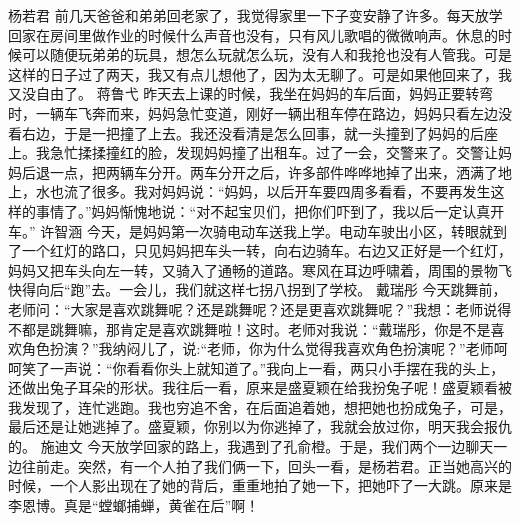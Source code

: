 {}\markdownRendererInterblockSeparator
{}杨若君\markdownRendererInterblockSeparator
{}前几天爸爸和弟弟回老家了，我觉得家里一下子变安静了许多。每天放学回家在房间里做作业的时候什么声音也没有，只有风儿歌唱的微微响声。休息的时候可以随便玩弟弟的玩具，想怎么玩就怎么玩，没有人和我抢也没有人管我。可是这样的日子过了两天，我又有点儿想他了，因为太无聊了。可是如果他回来了，我又没自由了。\markdownRendererInterblockSeparator
{}\markdownRendererInterblockSeparator
{}蒋鲁弋\markdownRendererInterblockSeparator
{}昨天去上课的时候，我坐在妈妈的车后面，妈妈正要转弯时，一辆车飞奔而来，妈妈急忙变道，刚好一辆出租车停在路边，妈妈只看左边没看右边，于是一把撞了上去。我还没看清是怎么回事，就一头撞到了妈妈的后座上。我急忙揉揉撞红的脸，发现妈妈撞了出租车。过了一会，交警来了。交警让妈妈后退一点，把两辆车分开。两车分开之后，许多部件哗哗地掉了出来，洒满了地上，水也流了很多。我对妈妈说：“妈妈，以后开车要四周多看看，不要再发生这样的事情了。”妈妈惭愧地说：“对不起宝贝们，把你们吓到了，我以后一定认真开车。”\markdownRendererInterblockSeparator
{}\markdownRendererInterblockSeparator
{}许智涵\markdownRendererInterblockSeparator
{}今天，是妈妈第一次骑电动车送我上学。电动车驶出小区，转眼就到了一个红灯的路口，只见妈妈把车头一转，向右边骑车。右边又正好是一个红灯，妈妈又把车头向左一转，又骑入了通畅的道路。寒风在耳边呼啸着，周围的景物飞快得向后“跑”去。一会儿，我们就这样七拐八拐到了学校。 \markdownRendererInterblockSeparator
{}\markdownRendererInterblockSeparator
{}戴瑞彤\markdownRendererInterblockSeparator
{}今天跳舞前，老师问：“大家是喜欢跳舞呢？还是跳舞呢？还是更喜欢跳舞呢？”我想：老师说得不都是跳舞嘛，那肯定是喜欢跳舞啦！这时。老师对我说：“戴瑞彤，你是不是喜欢角色扮演？”我纳闷儿了，说:“老师，你为什么觉得我喜欢角色扮演呢？”老师呵呵笑了一声说：“你看看你头上就知道了。”我向上一看，两只小手摆在我的头上，还做出兔子耳朵的形状。我往后一看，原来是盛夏颖在给我扮兔子呢！盛夏颖看被我发现了，连忙逃跑。我也穷追不舍，在后面追着她，想把她也扮成兔子，可是，最后还是让她逃掉了。盛夏颖，你别以为你逃掉了，我就会放过你，明天我会报仇的。\markdownRendererInterblockSeparator
{}\markdownRendererInterblockSeparator
{}施迪文\markdownRendererInterblockSeparator
{}今天放学回家的路上，我遇到了孔俞橙。于是，我们两个一边聊天一边往前走。突然，有一个人拍了我们俩一下，回头一看，是杨若君。正当她高兴的时候，一个人影出现在了她的背后，重重地拍了她一下，把她吓了一大跳。原来是李恩博。真是“螳螂捕蝉，黄雀在后”啊！\markdownRendererInterblockSeparator
